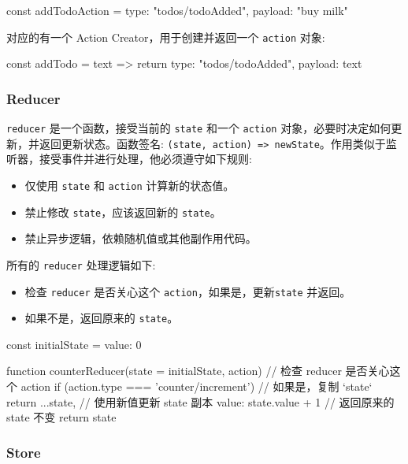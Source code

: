 \begin{JavaScript}
const addTodoAction = {
  type: "todos/todoAdded",
  payload: "buy milk"
}
\end{JavaScript}

对应的有一个 Action Creator，用于创建并返回一个 \texttt{action} 对象:

\begin{JavaScript}
const addTodo = text => {
  return {
    type: "todos/todoAdded",
    payload: text
  }
}
\end{JavaScript}

\subsubsection*{Reducer}

\texttt{reducer} 是一个函数，接受当前的 \texttt{state} 和一个 \texttt{action} 对象，必要时决定如何更新，并返回更新状态。函数签名: \texttt{(state, action) => newState}。作用类似于监听器，接受事件并进行处理，他必须遵守如下规则:

\begin{itemize}
  \item 仅使用 \texttt{state} 和 \texttt{action} 计算新的状态值。
  \item 禁止修改 \texttt{state}，应该返回新的 \texttt{state}。
  \item 禁止异步逻辑，依赖随机值或其他副作用代码。
\end{itemize}

所有的 \texttt{reducer} 处理逻辑如下:
\begin{itemize}
  \item 检查 \texttt{reducer} 是否关心这个 \texttt{action}，如果是，更新\texttt{state} 并返回。
  \item 如果不是，返回原来的 \texttt{state}。
\end{itemize}

\begin{JavaScript}
const initialState = { value: 0 }

function counterReducer(state = initialState, action) {
  // 检查 reducer 是否关心这个 action
  if (action.type === 'counter/increment') {
    // 如果是，复制 `state`
    return {
      ...state,
      // 使用新值更新 state 副本
      value: state.value + 1
    }
  }
  // 返回原来的 state 不变
  return state
}
\end{JavaScript}

\subsubsection*{Store}


